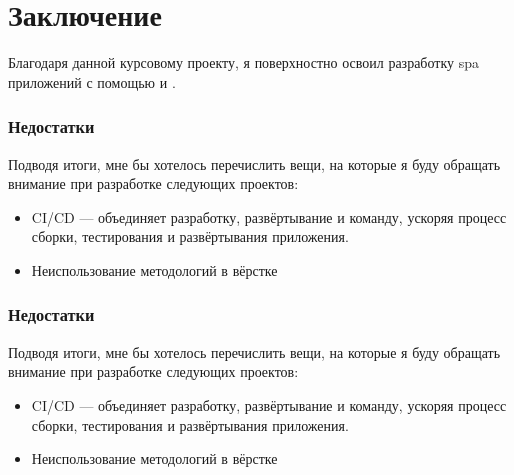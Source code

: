 \section{Заключение}
Благодаря данной курсовому проекту, я поверхностно освоил разработку \acrshort{spa} приложений с помощью \textcite{react} и \textcite{express}.

\subsubsection{Недостатки}
Подводя итоги, мне бы хотелось перечислить вещи, на которые я буду обращать внимание при разработке следующих проектов:
\begin{itemize}
    \item CI/CD --- объединяет разработку, развёртывание и команду, ускоряя процесс сборки, тестирования и развёртывания приложения.
    \item Неиспользование методологий в вёрстке
\end{itemize}

\subsubsection{Недостатки}
Подводя итоги, мне бы хотелось перечислить вещи, на которые я буду обращать внимание при разработке следующих проектов:
\begin{itemize}
    \item CI/CD --- объединяет разработку, развёртывание и команду, ускоряя процесс сборки, тестирования и развёртывания приложения.
    \item Неиспользование методологий в вёрстке
\end{itemize}

\clearpage